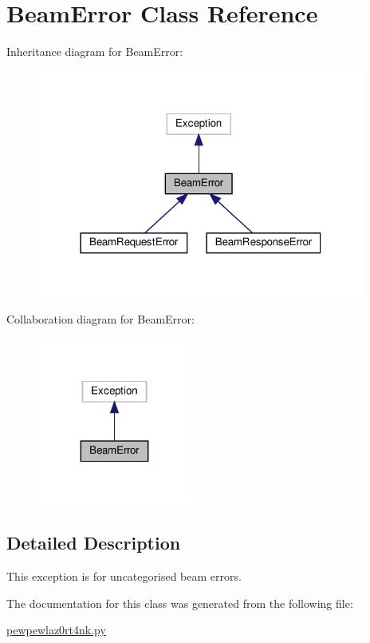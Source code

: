 \hypertarget{classpewpewlaz0rt4nk_1_1_beam_error}{}\section{Beam\+Error Class Reference}
\label{classpewpewlaz0rt4nk_1_1_beam_error}


Inheritance diagram for Beam\+Error\+:
\nopagebreak
\begin{figure}[H]
\begin{center}
\leavevmode
\includegraphics[width=306pt]{classpewpewlaz0rt4nk_1_1_beam_error__inherit__graph}
\end{center}
\end{figure}


Collaboration diagram for Beam\+Error\+:
\nopagebreak
\begin{figure}[H]
\begin{center}
\leavevmode
\includegraphics[width=143pt]{classpewpewlaz0rt4nk_1_1_beam_error__coll__graph}
\end{center}
\end{figure}


\subsection{Detailed Description}
\begin{DoxyVerb}This exception is for uncategorised beam errors.\end{DoxyVerb}
 

The documentation for this class was generated from the following file\+:\begin{DoxyCompactItemize}
\item 
\hyperlink{pewpewlaz0rt4nk_8py}{pewpewlaz0rt4nk.\+py}\end{DoxyCompactItemize}
